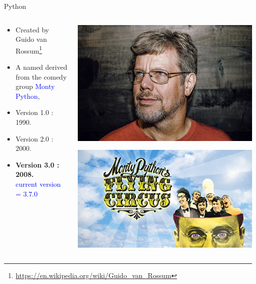 \documentclass[compress, color = usenames, dvipsnames]{beamer}
\begin{document}
\begin{frame}{Python}
\begin{columns}    
\begin{column}{0.5\textwidth}
\begin{itemize}
    \item Created by Guido van Rossum\footnote{\url{https://en.wikipedia.org/wiki/Guido_van_Rossum}}
    \item A named derived from the comedy group \textcolor{blue}{Monty Python},
    \item Version 1.0 : 1990.
    \item Version 2.0 : 2000.
    \item \textbf{Version 3.0 : 2008.} \\
    \textcolor{blue}{current version = 3.7.0}
\end{itemize}
\end{column}

\begin{column}{0.5\textwidth}
\includegraphics[width=\textwidth]{./Images/guido.jpg}

\includegraphics[width=\textwidth]{./Images/monty.jpg}
\end{column}
\end{columns}

\end{frame}
\end{document}
